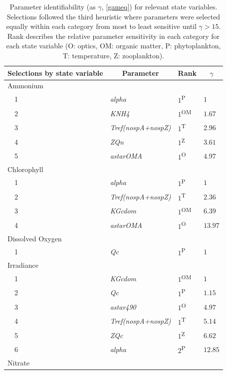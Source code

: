 \documentclass[letterpaper,12pt,oneside]{article}\usepackage[]{graphicx}\usepackage[]{color}
\begin{document}
\begin{table}[!tbp]
{\footnotesize
\caption{Parameter identifiability (as $\gamma$, \cref{gameq}) for relevant state variables.  Selections followed the third heuristic where parameters were selected equally within each category from most to least sensitive until $\gamma > 15$.  Rank describes the relative parameter sensitivity in each category for each state variable (O: optics, OM: organic matter, P: phytoplankton, T: temperature, Z: zooplankton).\label{tab:heurist3}} 
\begin{center}
\begin{tabular}{llll}
\hline\hline
\multicolumn{1}{l}{Selections by state variable}&\multicolumn{1}{c}{Parameter}&\multicolumn{1}{c}{Rank}&\multicolumn{1}{c}{$\gamma$}\tabularnewline
\hline
{Ammonium}&&&\tabularnewline
~~1&\footnotesize{\textit{alpha}}&$1$\textsuperscript{P}&$1$\tabularnewline
~~2&\footnotesize{\textit{KNH4}}&$1$\textsuperscript{OM}&$1.67$\tabularnewline
~~3&\footnotesize{\textit{Tref(nospA+nospZ)}}&$1$\textsuperscript{T}&$2.96$\tabularnewline
~~4&\footnotesize{\textit{ZQn}}&$1$\textsuperscript{Z}&$3.61$\tabularnewline
~~5&\footnotesize{\textit{astarOMA}}&$1$\textsuperscript{O}&$4.97$\tabularnewline
\hline
{Chlorophyll}&&&\tabularnewline
~~1&\footnotesize{\textit{alpha}}&$1$\textsuperscript{P}&$1$\tabularnewline
~~2&\footnotesize{\textit{Tref(nospA+nospZ)}}&$1$\textsuperscript{T}&$2.36$\tabularnewline
~~3&\footnotesize{\textit{KGcdom}}&$1$\textsuperscript{OM}&$6.39$\tabularnewline
~~4&\footnotesize{\textit{astarOMA}}&$1$\textsuperscript{O}&$13.97$\tabularnewline
\hline
{Dissolved Oxygen}&&&\tabularnewline
~~1&\footnotesize{\textit{Qc}}&$1$\textsuperscript{P}&$1$\tabularnewline
\hline
{Irradiance}&&&\tabularnewline
~~1&\footnotesize{\textit{KGcdom}}&$1$\textsuperscript{OM}&$1$\tabularnewline
~~2&\footnotesize{\textit{Qc}}&$1$\textsuperscript{P}&$1.15$\tabularnewline
~~3&\footnotesize{\textit{astar490}}&$1$\textsuperscript{O}&$4.97$\tabularnewline
~~4&\footnotesize{\textit{Tref(nospA+nospZ)}}&$1$\textsuperscript{T}&$5.14$\tabularnewline
~~5&\footnotesize{\textit{ZQc}}&$1$\textsuperscript{Z}&$6.62$\tabularnewline
~~6&\footnotesize{\textit{alpha}}&$2$\textsuperscript{P}&$12.85$\tabularnewline
\hline
{Nitrate}&&&\tabularnewline

\end{tabular}
\end{center}}
\end{table}
\end{document}
